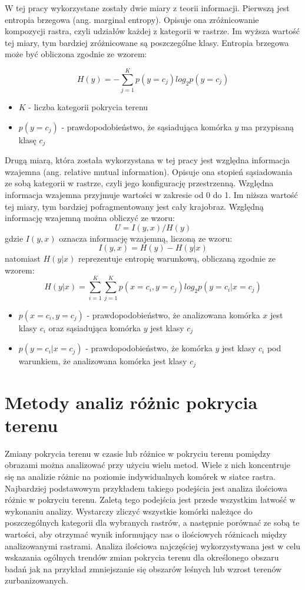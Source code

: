\documentclass{amuthesis}
\begin{document}
W tej pracy wykorzystane zostały dwie miary z teorii informacji.
Pierwszą jest entropia brzegowa (ang. marginal entropy). Opisuje ona
zróżnicowanie kompozycji rastra, czyli udziałów każdej z kategorii w
rastrze. Im wyższa wartość tej miary, tym bardziej zróżnicowane są
poszczególne klasy. Entropia brzegowa może być obliczona zgodnie ze
wzorem:

\[H(y) = -\sum_{j=1}^{K}p(y=c_{j})log_2p(y=c_j)\]

\begin{itemize}
\item
  \(K\) - liczba kategorii pokrycia terenu
\item
  \(p(y = c_j)\) - prawdopodobieństwo, że sąsiadująca komórka \(y\) ma
  przypisaną klasę \(c_j\)
\end{itemize}

Drugą miarą, która została wykorzystana w tej pracy jest względna
informacja wzajemna (ang. relative mutual information). Opisuje ona
stopień sąsiadowania ze sobą kategorii w rastrze, czyli jego
konfigurację przestrzenną. Względna informacja wzajemna przyjmuje
wartości w zakresie od 0 do 1. Im niższa wartość tej miary, tym bardziej
pofragmentowany jest cały krajobraz. Względną informację wzajemną można
obliczyć ze wzoru: \[U = I(y,x)/H(y)\] gdzie \(I(y,x)\) oznacza
informację wzajemną, liczoną ze wzoru: \[I(y,x) = H(y) - H(y|x)\]
natomiast \(H(y|x)\) reprezentuje entropię warunkową, obliczaną zgodnie
ze wzorem:
\[H(y|x) = \sum_{i=1}^{K}\sum_{j=1}^{K} p(x=c_i, y=c_j) log_2 p(y=c_i | x=c_j)\]

\begin{itemize}
\item
  \(p(x=c_i, y=c_j)\) - prawdopodobieństwo, że analizowana komórka \(x\)
  jest klasy \(c_i\) oraz sąsiadująca komórka \(y\) jest klasy \(c_j\)
\item
  \(p(y=c_i | x=c_j)\) - prawdopodobieństwo, że komórka \(y\) jest klasy
  \(c_i\) pod warunkiem, że analizowana komórka jest klasy \(c_j\)
\end{itemize}

\hypertarget{sec-pattern-based}{%
\section{Metody analiz różnic pokrycia terenu}\label{sec-pattern-based}}

Zmiany pokrycia terenu w czasie lub różnice w pokryciu terenu pomiędzy
obrazami można analizować przy użyciu wielu metod. Wiele z nich
koncentruje się na analizie różnic na poziomie indywidualnych komórek w
siatce rastra. Najbardziej podstawowym przykładem takiego podejścia jest
analiza ilościowa różnic w pokryciu terenu. Zaletą tego podejścia jest
przede wszystkim łatwość w wykonaniu analizy. Wystarczy zliczyć
wszystkie komórki należące do poszczególnych kategorii dla wybranych
rastrów, a następnie porównać ze sobą te wartości, aby otrzymać wynik
informujący nas o ilościowych różnicach między analizowanymi rastrami.
Analiza ilościowa najczęściej wykorzystywana jest w celu wskazania
ogólnych trendów zmian pokrycia terenu dla określonego obszaru badań jak
na przykład zmniejszanie się obszarów leśnych lub wzrost terenów
zurbanizowanych.
\end{document}
